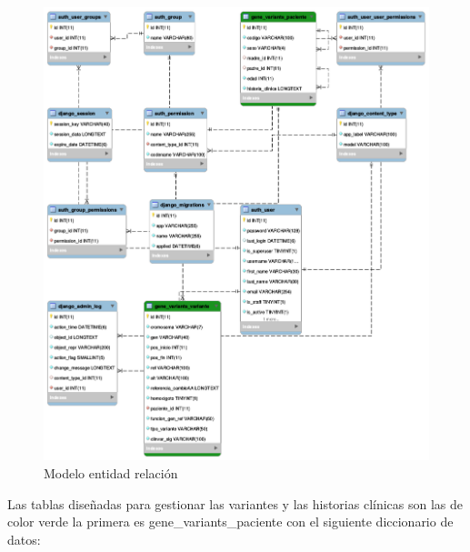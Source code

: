\begin{figure}[H]
	\centering
	\includegraphics[width=1\textwidth]{Kap3/EER}
	\caption{Modelo entidad relación} \label{fig:t}
\end{figure}

Las tablas diseñadas para gestionar las variantes y las historias clínicas son las de color verde la primera es gene\_variants\_paciente con el siguiente diccionario de datos:

